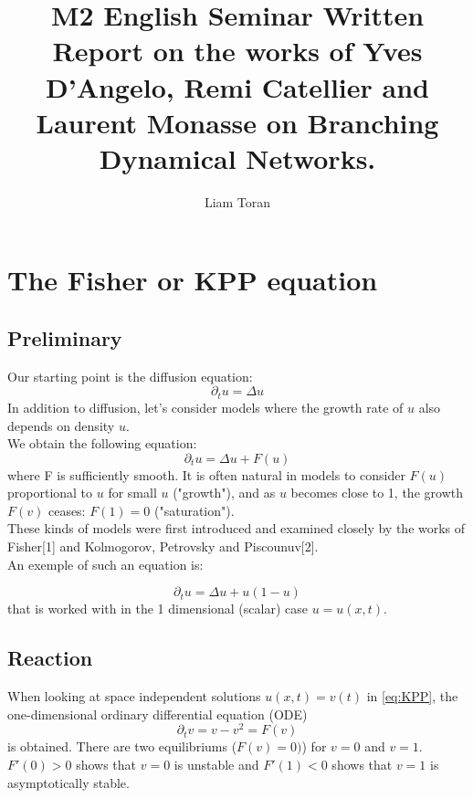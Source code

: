 \documentclass[17pt]{extarticle}
\title{M2 English Seminar Written Report on the works of Yves D'Angelo, Remi Catellier and Laurent Monasse on Branching Dynamical Networks.}
\author{Liam Toran}
\newcommand{\dt}{\partial_t}
\begin{document}
\maketitle
\newpage
\tableofcontents
\newpage
\section{The Fisher or KPP equation}
\subsection{Preliminary}
Our starting point is the diffusion equation:\begin{equation}\dt u = \Delta u  \end{equation}
In addition to diffusion, let's consider models where the growth rate of $u$ also depends on density $u$.\\
We obtain the following equation:
\begin{equation}\dt u = \Delta u + F(u) \label{eq:ReaDi} \end{equation} 
where F is sufficiently smooth.
It is often natural in models to consider $F(u)$ proportional to $u$ for small $u$ ("growth"), and as $u$ becomes close to 1, the growth $F(v)$ ceases: $F(1)=0$ ("saturation").\\
These kinds of models were first introduced and examined closely by the works of Fisher[1] and Kolmogorov, Petrovsky and Piscounuv[2].\\
An exemple of such an equation is:

\begin{equation}
	\dt u = \Delta u +u(1-u) \label{eq:KPP}
\end{equation}
that is worked with in the 1 dimensional (scalar) case $u=u(x,t)$.

\subsection{Reaction}
When looking at space independent solutions $u(x,t)=v(t)$ in \eqref{eq:KPP}, the one-dimensional ordinary differential equation (ODE) \begin{equation}
	\dt v = v - v^2 = F(v)
\end{equation}
is obtained. There are two equilibriums ($F(v)=0)$) for $v=0$ and $v=1$. $F'(0)>0$ shows that $v=0$ is unstable and $F'(1)<0$ shows that $v=1$ is asymptotically stable.
\end{document}
